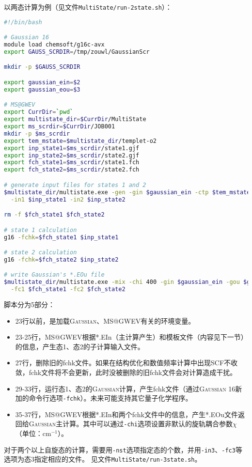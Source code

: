 \documentclass[UTF8]{ctexart}
\begin{document}
以两态计算为例（见文件\verb|MultiState/run-2state.sh|）：
\begin{lstlisting}[language=bash,morekeywords={module, mkdir}]
#!/bin/bash

# Gaussian 16
module load chemsoft/g16c-avx
export GAUSS_SCRDIR=/tmp/zouwl/GaussianScr

mkdir -p $GAUSS_SCRDIR

export gaussian_ein=$2
export gaussian_eou=$3

# MS@GWEV
export CurrDir=`pwd`
export multistate_dir=$CurrDir/MultiState
export ms_scrdir=$CurrDir/JOB001
mkdir -p $ms_scrdir
export tem_mstate=$multistate_dir/templet-o2
export inp_state1=$ms_scrdir/state1.gjf
export inp_state2=$ms_scrdir/state2.gjf
export fch_state1=$ms_scrdir/state1.fch
export fch_state2=$ms_scrdir/state2.fch

# generate input files for states 1 and 2
$multistate_dir/multistate.exe -gen -gin $gaussian_ein -ctp $tem_mstate \
  -in1 $inp_state1 -in2 $inp_state2

rm -f $fch_state1 $fch_state2

# state 1 calculation
g16 -fchk=$fch_state1 $inp_state1

# state 2 calculation
g16 -fchk=$fch_state2 $inp_state2

# write Gaussian's *.EOu file
$multistate_dir/multistate.exe -mix -chi 400 -gin $gaussian_ein -gou $gaussian_eou \
  -fc1 $fch_state1 -fc2 $fch_state2
\end{lstlisting}
脚本分为5部分：
\begin{itemize}
\item 23行以前，是加载\textsc{Gaussian}、MS@GWEV有关的环境变量。
\item 23-25行，MS@GWEV根据*.EIn（主计算产生）和模板文件（内容见下一节）的信息，产生态1、态2的子计算输入文件。
\item 27行，删除旧的fchk文件。如果在结构优化和数值频率计算中出现SCF不收敛，fchk文件将不会更新，此时没被删除的旧fchk文件会对计算造成干扰。
\item 29-33行，运行态1、态2的\textsc{Gaussian}计算，产生fchk文件（通过\textsc{Gaussian} 16新加的命令行选项\verb|-fchk|）。未来可能支持其它量子化学程序。
\item 35-37行，MS@GWEV根据*.EIn和两个fchk文件中的信息，产生*.EOu文件返回给\textsc{Gaussian}主计算。其中可以通过\verb|-chi|选项设置非默认的旋轨耦合参数$\chi$（单位：cm$^{-1}$）。
\end{itemize}

对于两个以上自旋态的计算，需要用\verb|-nst|选项指定态的个数，并用\verb|-in3|、\verb|-fc3|等选项为态3指定相应的文件。
见文件\verb|MultiState/run-3state.sh|。
\end{document}
